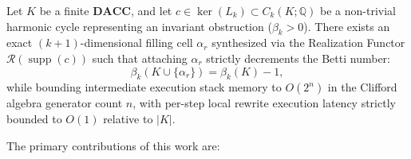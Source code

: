 \documentclass[acmsmall,screen,nonacm]{acmart}
\newcommand{\DACC}{\mathbf{DACC}}
\newcommand{\Real}{\mathcal{R}}
\newcommand{\supp}{\operatorname{supp}}
\begin{document}
\begin{theorem}
\label{thm:hybrid-informal}
Let $K$ be a finite $\DACC$, and let $c \in \ker(L_k) \subset C_k(K;\mathbb{Q})$ be a non-trivial harmonic cycle representing an invariant obstruction ($\beta_k > 0$). There exists an exact $(k+1)$-dimensional filling cell $\alpha_r$ synthesized via the Realization Functor $\Real(\supp(c))$ such that attaching $\alpha_r$ strictly decrements the Betti number:
\[
  \beta_k(K \cup \{\alpha_r\}) = \beta_k(K) - 1,
\]
while bounding intermediate execution stack memory to $O(2^n)$ in the Clifford algebra generator count $n$, with per-step local rewrite execution latency strictly bounded to $O(1)$ relative to $|K|$.
\end{theorem}

The primary contributions of this work are:
\end{document}
